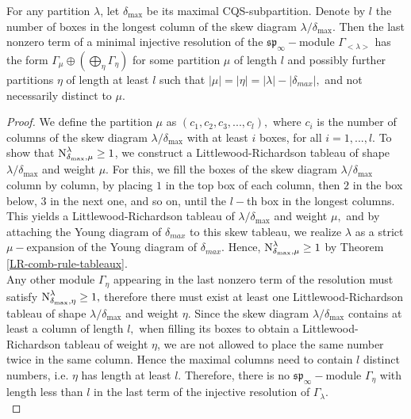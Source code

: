 \documentclass[main.tex]{subfiles}
\begin{document}
\bigskip
\begin{prop}
\label{prop-last-res-term}
    For any partition $\lambda$, let $\delta_{\text{max}}$ be its maximal CQS-subpartition. Denote by $l$ the number of boxes in the longest column of the skew diagram $\lambda/\delta_{\text{max}}$. 
    Then the last nonzero term of a minimal injective resolution of the $\mathfrak{sp}_\infty-$module $\Gamma_{<\lambda>}$ has the form $\Gamma_\mu\oplus(\bigoplus\limits_{\eta}\Gamma_\eta)$ for some partition $\mu$ of length $l$ and possibly further partitions $\eta$ of length at least $l$ such that $|\mu| = |\eta|=|\lambda|-|\delta_{max}|,$ and not necessarily distinct to $\mu$.
\end{prop}

\begin{proof}
    We define the partition $\mu$ as $(c_1, c_2, c_3, ..., c_l),$ where $c_i$ is the number of columns of the skew diagram $\lambda/\delta_{\text{max}}$  with at least $i$ boxes, for all $i=1,...,l.$ To show that $\text{N}^{\lambda}_{\delta_{\text{max}}, \mu}\geq 1$, we construct a Littlewood-Richardson tableau of shape $\lambda/\delta_{\text{max}}$ and weight $\mu.$ For this, we fill the boxes of the skew diagram $\lambda/\delta_{\text{max}}$ column by column, by placing $1$ in the top box of each column, then $2$ in the box below, $3$ in the next one, and so on, until the $l-$th box in the longest columns. This yields a Littlewood-Richardson tableau of $\lambda/\delta_{\text{max}}$ and weight $\mu,$ and by attaching the Young diagram of $\delta_{max}$ to this skew tableau, we realize $\lambda$ as a strict $\mu-$expansion of the Young diagram of $\delta_{max}$.  Hence, $\text{N}^{\lambda}_{\delta_{\text{max}}, \mu}\geq 1$ by Theorem \ref{LR-comb-rule-tableaux}.\\
    
    Any other module $\Gamma_\eta$ appearing in the last nonzero term of the resolution must satisfy $\text{N}^{\lambda}_{\delta_{\text{max}}, \eta}\geq 1,$ therefore there must exist at least one Littlewood-Richardson tableau of shape $\lambda/\delta_{\text{max}}$ and weight $\eta$. Since the skew diagram $\lambda/\delta_{\text{max}}$ contains at least a column of length $l,$ when filling its boxes to obtain a Littlewood-Richardson tableau of weight $\eta$, we are not allowed to place the same number twice in the same column. Hence the maximal columns need to contain $l$ distinct numbers, i.e. $\eta$ has length at least $l$. Therefore, there is no $\mathfrak{sp}_\infty-$module $\Gamma_\eta$ with length less than $l$ in the last term of the injective resolution of $\Gamma_\lambda$.\\
\end{proof}
\bigskip
\end{document}

